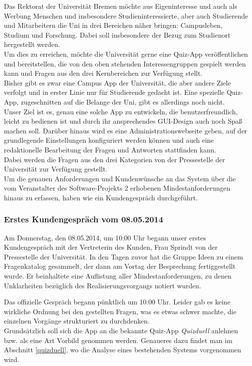 \documentclass[fontsize=12pt,paper=a4,twoside]{scrartcl}
\begin{document}
Das Rektorat der Universität Bremen möchte aus Eigeninteresse und auch als Werbung Menschen und insbesondere Studieninteressierte, aber auch Studierende und Mitarbeitern die Uni in drei Bereichen näher bringen: Campusleben, Studium und Forschung. Dabei soll insbesondere der Bezug zum Studienort hergestellt werden.\\
Um dies zu erreichen, möchte die Universität gerne eine Quiz-App veröffentlichen und bereitstellen, die von den oben stehenden Interessengruppen gespielt werden kann und Fragen aus den drei Kernbereichen zur Verfügung stellt.\\
Bisher gibt es zwar eine Campus App der Universität, die aber andere Ziele verfolgt und in erster Linie nur für Studierende gedacht ist. Eine spezielle Quiz-App, zugeschnitten auf die Belange der Uni, gibt es allerdings noch nicht. \\
Unser Ziel ist es, genau eine solche App zu entwickeln, die benutzerfreundlich, leicht zu bedienen ist und durch ihr ansprechendes GUI-Design auch noch Spaß machen soll. Darüber hinaus wird es eine Administrationswebseite geben, auf der grundlegende Einstellungen konfiguriert werden können und auch eine redaktionelle Bearbeitung der Fragen und Antworten stattfinden kann.\\
Dabei werden die Fragen aus den drei Kategorien von der Pressestelle der Universität zur Verfügung gestellt. \\
Um die genauen Anforderungen und Kundenwünsche an das System über die vom Veranstalter des Software-Projekts 2 erhobenen Mindestanforderungen hinaus zu erfassen, haben wie ein Kundengespräch durchgeführt.

\subsubsection{Erstes Kundengespräch vom 08.05.2014}

Am Donnerstag, den 08.05.2014, um 10:00 Uhr begann unser erstes Kundengespräch mit der Vertreterin des Kunden, Frau Sprindt von der Pressestelle der Universität. In den Tagen zuvor hat die Gruppe Ideen zu einem Fragenkatalog gesammelt, der dann am Vortag der Besprechung fertiggestellt wurde. Er beinhaltete eine Auflistung aller Mindestanforderungen, zu denen Unklarheiten bezüglich des Realisierungsvorgangs notiert wurden. 

Das offizielle Gespräch begann pünktlich um 10:00 Uhr. Leider gab es keine wirkliche Ordnung bei den gestellten Fragen, was es etwas schwer machte, die einzelnen Vorgänge strukturiert zu durchdenken.\\
Grundsätzlich soll sich die App an die bekannte Quiz-App \textit{Quizduell} anlehnen bzw. als eine Art Vorbild genommen werden. Genaueres dazu findet man im Abschnitt \ref{quizduell}, wo die Analyse eines bestehenden Systems vorgenommen wird.
\end{document}
